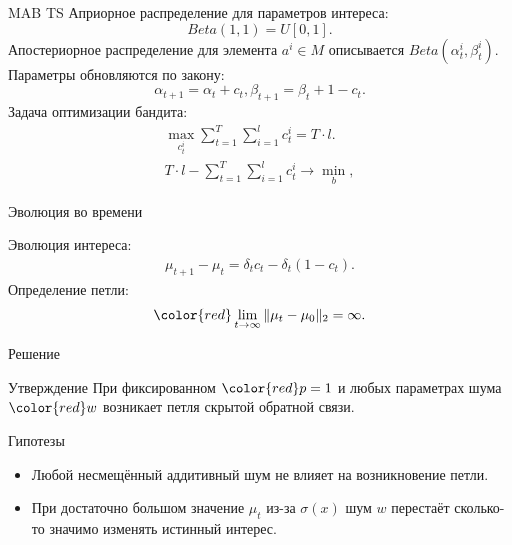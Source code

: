 \documentclass{beamer}
\begin{document}
\begin{frame}{MAB TS}
Априорное распределение для параметров интереса: 
\[Beta(1, 1) = U[0, 1].\] 
Апостериорное распределение для элемента $a^i \in M$ описывается $Beta(\alpha_t^i, \beta_t^i)$. 
Параметры обновляются по закону:
\[\alpha_{t+1} = \alpha_t + c_t, \beta_{t+1} = \beta_t + 1 - c_t.\]
Задача оптимизации бандита:
\begin{gather*}  
\max_{c_t^i} \sum_{t = 1}^T \sum_{i = 1}^l c_t^i = T \cdot l.\\ 
   T \cdot l - \sum_{t = 1}^T \sum_{i = 1}^l c_t^i \to \min_{b}, 
\end{gather*}
\end{frame}
\begin{frame}{Эволюция во времени}

  Эволюция интереса:
  \begin{gather*}
\mu_{t+1} - \mu_{t} = \delta_t c_t - \delta_t (1 - c_t). 
  \end{gather*}
  Определение петли:
\begin{gather*}
  \color{red} \lim_{t \to \infty} \|\mu_t - \mu_0 \|_2 = \infty.
\end{gather*}
\end{frame}
\begin{frame}{Решение}
  \begin{block}{Утверждение}
    При фиксированном $\color{red} p = 1$ и любых параметрах шума $\color{red} w$ возникает петля скрытой обратной связи. 
  \end{block}
  \begin{block}{Гипотезы}
  \begin{itemize}
      \item Любой несмещённый аддитивный шум не влияет на возникновение петли. 
      \item При достаточно большом значение $\mu_t$ из-за $\sigma (x)$ шум $w$ перестаёт сколько-то значимо изменять истинный интерес. 
  \end{itemize}
  \end{block}
\end{frame}
\end{document}
